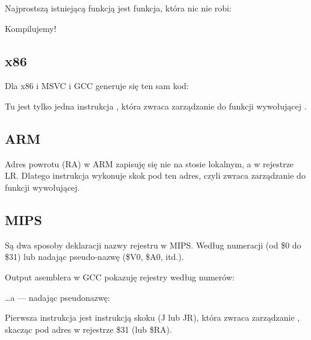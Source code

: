 \label{empty_func}

Najprostszą istniejącą funkcją jest funkcja, która nic nie robi:



Kompilujemy!

\subsection{x86}

Dla x86 i MSVC i GCC generuje się ten sam kod:



Tu jest tylko jedna instrukcja \RET, która zwraca zarządzanie do funkcji wywołującej .

\subsection{ARM}



Adres powrotu (\ac{RA}) w ARM zapisuję się nie na stosie lokalnym, a w rejestrze \ac{LR}.
Dlatego instrukcja  wykonuje skok pod ten adres, czyli zwraca zarządzanie do funkcji wywołującej.

\subsection{MIPS}

Są dwa sposoby deklaracji nazwy rejestru w MIPS. Według numeracji (od \$0 do \$31) lub nadając pseudo-nazwę (\$V0, \$A0, itd.).

Output asemblera w GCC pokazuję rejestry według numerów:



\dots a \IDA --- nadając pseudonazwę:




Pierwsza instrukcja jest instrukcją skoku (J lub JR),
która zwraca zarządzanie , skacząc pod adres w rejestrze \$31 (lub \$RA).

